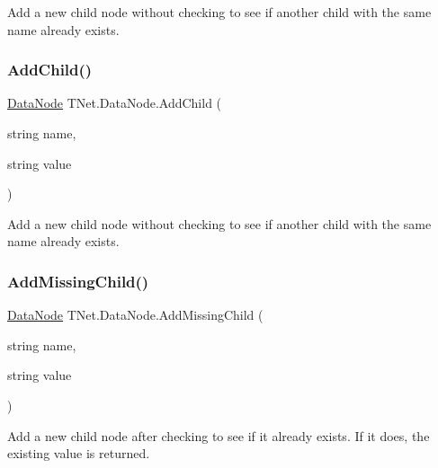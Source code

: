 Add a new child node without checking to see if another child with the same name already exists. 

\mbox{\label{class_t_net_1_1_data_node_a5b319a56a06eb157048a66a62b5b6787}} 
\subsubsection{\texorpdfstring{Add\+Child()}{AddChild()}\hspace{0.1cm}{\footnotesize\ttfamily [3/3]}}
{\footnotesize\ttfamily \mbox{\hyperlink{class_t_net_1_1_data_node}{Data\+Node}} T\+Net.\+Data\+Node.\+Add\+Child (\begin{DoxyParamCaption}\item[{string}]{name,  }\item[{string}]{value }\end{DoxyParamCaption})}



Add a new child node without checking to see if another child with the same name already exists. 

\mbox{\label{class_t_net_1_1_data_node_a746ea0c61bbba5fadf93038b4becffce}} 
\subsubsection{\texorpdfstring{Add\+Missing\+Child()}{AddMissingChild()}}
{\footnotesize\ttfamily \mbox{\hyperlink{class_t_net_1_1_data_node}{Data\+Node}} T\+Net.\+Data\+Node.\+Add\+Missing\+Child (\begin{DoxyParamCaption}\item[{string}]{name,  }\item[{string}]{value }\end{DoxyParamCaption})}



Add a new child node after checking to see if it already exists. If it does, the existing value is returned. 

\mbox{\label{class_t_net_1_1_data_node_a2b256944bcfce5d20366975fb5433db7}} 
